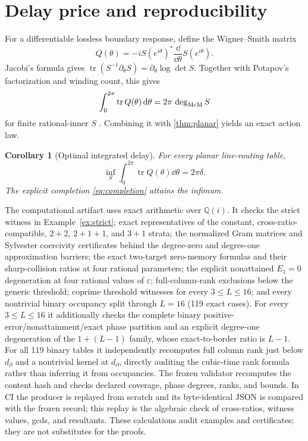 \documentclass[11pt]{article}
\newtheorem{corollary}[theorem]{Corollary}
\theoremstyle{definition}\newtheorem{definition}[theorem]{Definition}\newtheorem{example}[theorem]{Example}
\theoremstyle{remark}\newtheorem{remark}[theorem]{Remark}\newtheorem{limitation}[theorem]{Limitation}
\begin{document}
\section{Delay price and reproducibility}

For a differentiable lossless boundary response, define the Wigner--Smith
matrix
\[
                  Q(\theta)=-iS(e^{i\theta})^*
                             \frac{\dd}{\dd\theta}S(e^{i\theta}).
\]
Jacobi's formula gives
$\operatorname{tr}(S^{-1}\partial_\theta S)=\partial_\theta\log\det S$.
Together with Potapov's factorization and winding count, this gives
\[
             \int_0^{2\pi}\operatorname{tr}Q(\theta)\,\mathrm d\theta
             =2\pi\,\deg_{\mathrm{McM}} S
\]
for finite rational-inner $S$ \cite{Wigner1955,Smith1960}.  Combining it with
\cref{thm:planar} yields an exact action law.

\begin{corollary}[Optimal integrated delay]\label{cor:delay}
For every planar line-routing table,
\[
 \inf_S\int_0^{2\pi}\operatorname{tr}Q(\theta)\dd\theta=2\pi\delta.
\]
The explicit completion \eqref{eq:completion} attains the infimum.
\end{corollary}

The computational artifact uses exact arithmetic over $\mathbb Q(i)$.  It
checks the strict witness in Example~\ref{ex:strict}; exact representatives of the
constant, cross-ratio-compatible, $2+2$, $2+1+1$, and $3+1$ strata;
the normalized Gram matrices and Sylvester coercivity certificates behind the
degree-zero and degree-one approximation barriers; the exact two-target
zero-memory formulas and their sharp-collision ratios at four rational
parameters;
the explicit nonattained $E_1=0$ degeneration at four rational values of
$\varepsilon$;
full-column-rank exclusions below the
generic threshold; coprime threshold witnesses for every $3\le L\le16$; and
every nontrivial binary occupancy split through $L=16$ (119 exact cases).
For every $3\le L\le16$ it additionally checks the complete binary
positive-error/nonattainment/exact phase partition and an explicit degree-one
degeneration of the $1+(L-1)$ family, whose exact-to-border ratio is $L-1$.
For all 119 binary tables it independently recomputes full column rank just
below $d_\partial$ and a nontrivial kernel at $d_\partial$, directly auditing
the cubic-time rank formula rather than inferring it from occupancies.
The frozen validator recomputes the content hash and checks declared coverage,
phase degrees, ranks, and bounds.  In CI the producer is replayed from scratch
and its byte-identical JSON is compared with the frozen record; this replay is
the algebraic check of cross-ratios, witness values, gcds, and resultants.
These calculations
audit examples and certificates; they are not substitutes for the proofs.
\end{document}
